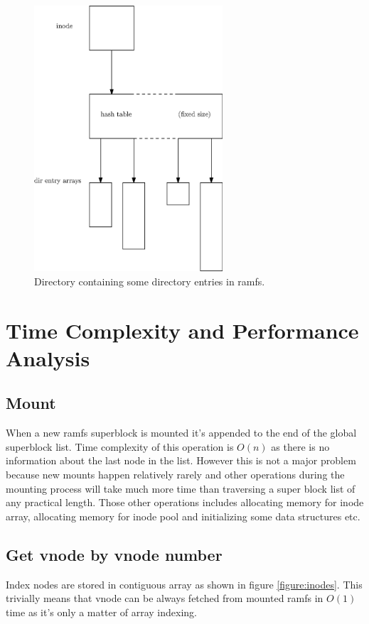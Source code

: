 \begin{figure}
  \center
  \includegraphics[width=7cm]{pics/dir}
  \caption{Directory containing some directory entries in ramfs.}
  \label{figure:dir}
\end{figure}


\section{Time Complexity and Performance Analysis}

\subsection{Mount}

When a new ramfs superblock is mounted it's appended to the end of the global
superblock list. Time complexity of this operation is $O(n)$ as there is no
information about the last node in the list. However this is not a major
problem because new mounts happen relatively rarely and other operations during
the mounting process will take much more time than traversing a super block list
of any practical length. Those other operations includes allocating memory for
inode array, allocating memory for inode pool and initializing some data
structures etc.

\subsection{Get vnode by vnode number}

Index nodes are stored in contiguous array as shown in figure
\ref{figure:inodes}. This trivially means that vnode can be always fetched
from mounted ramfs in $O(1)$ time as it's only a matter of array indexing.

